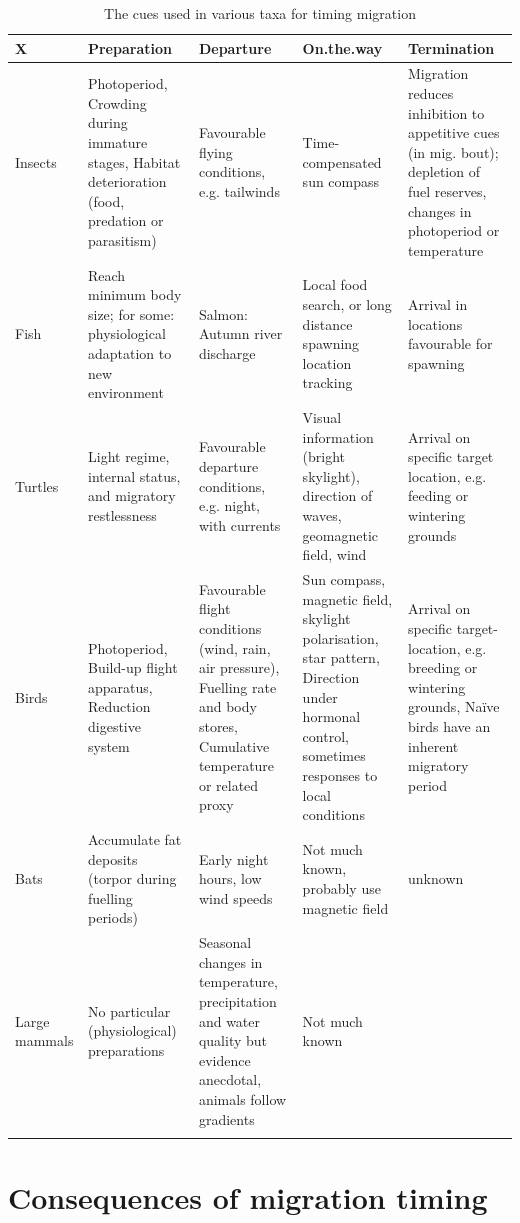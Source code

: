 \documentclass[
]{book}
\begin{document}
\begin{table}

\caption{\label{tab:nice-tab}The cues used in various taxa for timing migration}
\centering
\begin{tabular}[t]{lllll}
\toprule
X & Preparation & Departure & On.the.way & Termination\\
\midrule
Insects & Photoperiod, Crowding during immature stages, Habitat deterioration (food, predation or parasitism) & Favourable flying conditions, e.g. tailwinds & Time-compensated sun compass & Migration reduces inhibition to appetitive cues (in mig. bout); depletion of fuel reserves, changes in photoperiod or temperature\\
Fish & Reach minimum body size; for some: physiological adaptation to new environment & Salmon: Autumn river discharge & Local food search, or long distance spawning location tracking & Arrival in locations favourable for spawning\\
Turtles & Light regime, internal status, and migratory restlessness & Favourable departure conditions, e.g. night, with currents & Visual information (bright skylight), direction of waves, geomagnetic field, wind & Arrival on specific target location, e.g. feeding or wintering grounds\\
Birds & Photoperiod, Build-up flight apparatus, Reduction digestive system & Favourable flight conditions (wind, rain, air pressure), Fuelling rate and body stores, Cumulative temperature or related proxy & Sun compass, magnetic field, skylight polarisation, star pattern, Direction under hormonal control, sometimes responses to local conditions & Arrival on specific target-location, e.g. breeding or wintering grounds, Naïve birds have an inherent migratory period\\
Bats & Accumulate fat deposits (torpor during fuelling periods) & Early night hours, low wind speeds & Not much known, probably use magnetic field & unknown\\
\addlinespace
Large mammals & No particular (physiological) preparations & Seasonal changes in temperature, precipitation and water quality but evidence anecdotal, animals follow gradients & Not much known & \\
 &  &  &  & \\
\bottomrule
\end{tabular}
\end{table}

\hypertarget{consequences-of-migration-timing}{%
\section{Consequences of migration timing}\label{consequences-of-migration-timing}}
\end{document}
